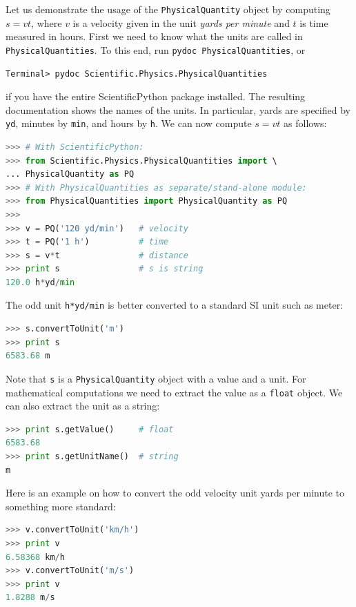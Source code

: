 \documentclass[graybox,envcountchap,sectrefs,final]{svmonodo}
\begin{document}
Let us demonstrate the usage of the \texttt{PhysicalQuantity} object by
computing $s=vt$, where $v$ is a velocity given in the unit \emph{yards per
minute} and $t$ is time measured in hours.  First we need to know what
the units are called in \texttt{PhysicalQuantities}.  To this end, run \texttt{pydoc PhysicalQuantities}, or

\begin{Verbatim}[frame=lines,label=\fbox{{\tiny Terminal}},framesep=2.5mm,framerule=0.7pt,fontsize=\fontsize{9pt}{9pt}]
Terminal> pydoc Scientific.Physics.PhysicalQuantities
\end{Verbatim}
if you have the entire ScientificPython package installed. The
resulting documentation shows the names of
the units. In particular,
yards are specified by \texttt{yd}, minutes by \texttt{min}, and hours
by \texttt{h}. We can now compute $s=vt$ as follows:

\begin{lstlisting}[language=Python,style=graycolor]
>>> # With ScientificPython:
>>> from Scientific.Physics.PhysicalQuantities import \ 
... PhysicalQuantity as PQ
>>> # With PhysicalQuantities as separate/stand-alone module:
>>> from PhysicalQuantities import PhysicalQuantity as PQ
>>>
>>> v = PQ('120 yd/min')   # velocity
>>> t = PQ('1 h')          # time
>>> s = v*t                # distance
>>> print s                # s is string
120.0 h*yd/min
\end{lstlisting}
The odd unit \texttt{h*yd/min} is better converted to a standard SI unit such
as meter:

\begin{lstlisting}[language=Python,style=graycolor]
>>> s.convertToUnit('m')
>>> print s
6583.68 m
\end{lstlisting}
Note that \texttt{s} is a \texttt{PhysicalQuantity} object with a value and a
unit. For mathematical computations we need to extract the
value as a \texttt{float} object. We can also extract the unit as a string:

\begin{lstlisting}[language=Python,style=graycolor]
>>> print s.getValue()     # float
6583.68
>>> print s.getUnitName()  # string
m
\end{lstlisting}

Here is an example on how to convert the odd velocity unit yards per
minute to something more standard:

\begin{lstlisting}[language=Python,style=graycolor]
>>> v.convertToUnit('km/h')
>>> print v
6.58368 km/h
>>> v.convertToUnit('m/s')
>>> print v
1.8288 m/s
\end{lstlisting}
\end{document}
